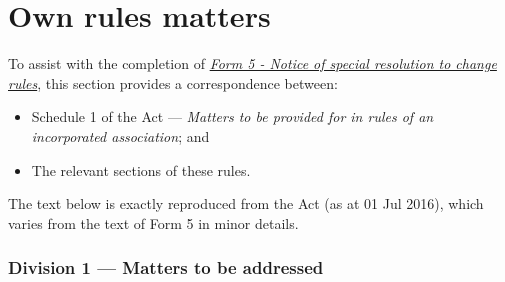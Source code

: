 \documentclass[../constitution.tex]{subfiles}
\begin{document}
\part*{Own rules matters}

To assist with the completion of \href{https://www.commerce.wa.gov.au/publications/notice-special-resolution-change-rules}{\textit{Form 5 - Notice of special resolution to change rules}}, this section provides a correspondence between:

\begin{itemize}
    \item Schedule 1 of the Act --- \textit{Matters to be provided for in rules of an incorporated association}; and
    \item The relevant sections of these rules.
\end{itemize}

The text below is exactly reproduced from the Act (as at 01 Jul 2016), which varies from the text of Form 5 in minor details.

\section*{Division 1 — Matters to be addressed}
\end{document}
